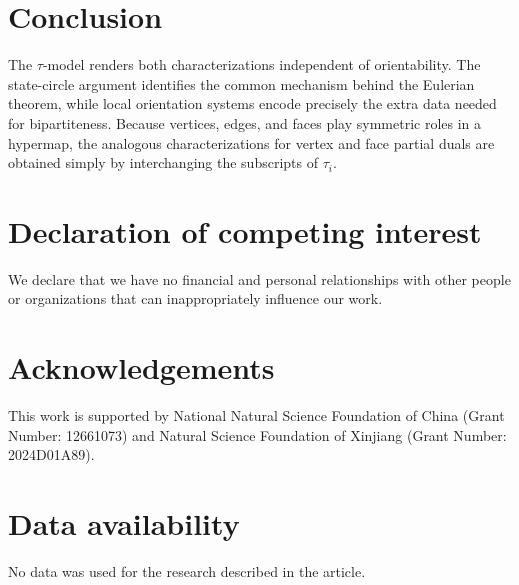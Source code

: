 \documentclass{article}
\theoremstyle{definition}
\theoremstyle{remark}
\begin{document}
\section{Conclusion}

The $\tau$-model renders both characterizations independent of orientability. The state-circle argument identifies the common mechanism behind the Eulerian theorem, while local orientation systems encode precisely the extra data needed for bipartiteness. Because vertices, edges, and faces play symmetric roles in a hypermap, the analogous characterizations for vertex and face partial duals are obtained simply by interchanging the subscripts of $\tau_i$.

\section*{Declaration of competing interest}
We declare that we have no financial and personal relationships with other people or organizations that can inappropriately influence our work.

\section*{Acknowledgements}
This work is supported by National Natural Science Foundation of China (Grant Number: 12661073) and Natural Science Foundation of Xinjiang (Grant Number: 2024D01A89).

\section*{Data availability}
No data was used for the research described in the article.


\end{document}
